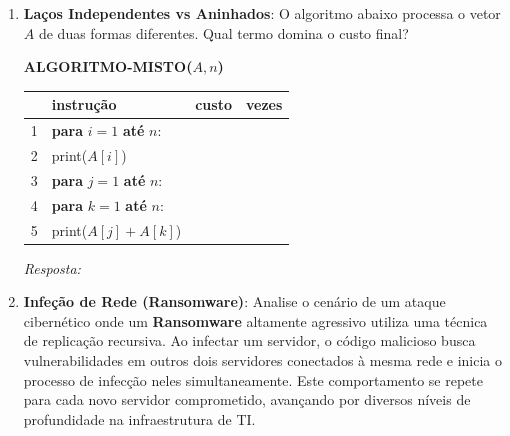 \documentclass[12pt]{article}
\newcommand{\quadro}[1]{\vspace{0.2cm}\begin{tcolorbox}[colback=white, colframe=black, height=#1, boxrule=0.5pt, arc=0pt] \textit{Resposta:} \end{tcolorbox}}
\begin{document}
\begin{enumerate}[label=\arabic*), leftmargin=1.5cm, itemsep=0.8cm]
    \item \textbf{Laços Independentes vs Aninhados}: O algoritmo abaixo processa o vetor $A$ de duas formas diferentes. Qual termo domina o custo final?

    \begin{tcolorbox}[colback=white, colframe=black, fontupper=\small]
        \textbf{ALGORITMO-MISTO($A, n$)} \\
        \begin{tabular}{llcc}
            \hline
            & \textbf{instrução} & \textbf{custo} & \textbf{vezes} \\
            \hline
            1 & \textbf{para} $i = 1$ \textbf{até} $n$: & \underline{\hspace{1cm}} & \underline{\hspace{1cm}} \\
            2 & \quad print($A[i]$) & \underline{\hspace{1cm}} & \underline{\hspace{1cm}} \\
            3 & \textbf{para} $j = 1$ \textbf{até} $n$: & \underline{\hspace{1cm}} & \underline{\hspace{1cm}} \\
            4 & \quad \textbf{para} $k = 1$ \textbf{até} $n$: & \underline{\hspace{1cm}} & \underline{\hspace{1cm}} \\
            5 & \quad \quad print($A[j] + A[k]$) & \underline{\hspace{1cm}} & \underline{\hspace{1cm}} \\
            \hline
        \end{tabular}
    \end{tcolorbox}
    \quadro{2cm}

    \item \textbf{Infeção de Rede (Ransomware)}: Analise o cenário de um ataque cibernético onde um \textbf{Ransomware} altamente agressivo utiliza uma técnica de replicação recursiva. Ao infectar um servidor, o código malicioso busca vulnerabilidades em outros dois servidores conectados à mesma rede e inicia o processo de infecção neles simultaneamente. Este comportamento se repete para cada novo servidor comprometido, avançando por diversos níveis de profundidade na infraestrutura de TI. 
    

\end{enumerate}
\end{document}
